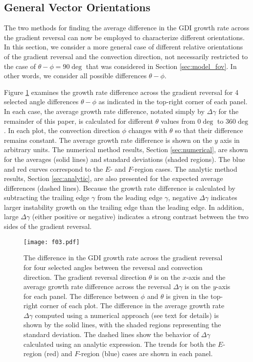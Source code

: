 \subsection{General Vector Orientations}

The two methods for finding the average difference in the GDI growth rate across the gradient reversal can now be employed to characterize different orientations. In this section, we consider a more general case of different relative orientations of the gradient reversal and the convection direction, not necessarily restricted to the case of \(\theta- \phi= 90\deg\) that was considered in Section \ref{sec:model_fov}. In other words, we consider all possible differences \(\theta- \phi\).

Figure \ref{fig:3} examines the growth rate difference across the gradient reversal for 4 selected angle differences \(\theta- \phi\) as indicated in the top-right corner of each panel. In each case, the average growth rate difference, notated simply by \(\Delta\gamma\) for the remainder of this paper, is calculated for different \(\theta\) values from \(0\deg\) to \(360\deg\). In each plot, the convection direction \(\phi\) changes with \(\theta\) so that their difference remains constant. The average growth rate difference is shown on the \(y\) axis in arbitrary units. The numerical method results, Section \ref{sec:numerical}, are shown for the averages (solid lines) and standard deviations (shaded regions). The blue and red curves correspond to the \(E\)- and \(F\)-region cases. The analytic method results, Section \ref{sec:analytic}, are also presented for the expected average differences (dashed lines). Because the growth rate difference is calculated by subtracting the trailing edge \(\gamma\) from the leading edge \(\gamma\), negative \(\Delta\gamma\) indicates larger instability growth on the trailing edge than the leading edge. In addition, large \(\Delta\gamma\) (either positive or negative) indicates a strong contrast between the two sides of the gradient reversal.

\begin{figure}
	\centering
	\texttt{[image: f03.pdf]}
	\caption[GDI growth rates for set angle between \(\vec{V}_E\) and \(\vec{G}\)]{The difference in the GDI growth rate across the gradient reversal for four selected angles between the reversal and convection direction.  The gradient reversal direction \(\theta\) is on the \(x\)-axis and the average growth rate difference across the reversal \(\Delta\gamma\) is on the \(y\)-axis for each panel.  The difference between \(\phi\) and \(\theta\) is given in the top-right corner of each plot. The difference in the average growth rate \(\Delta\gamma\) computed using a numerical approach (see text for details) is shown by the solid lines, with the shaded regions representing the standard deviation.  The dashed lines show the behavior of \(\Delta\gamma\) calculated using an analytic expression. The trends for both the \(E\)-region (red) and \(F\)-region (blue) cases are shown in each panel.}
	\label{fig:3}
\end{figure}



